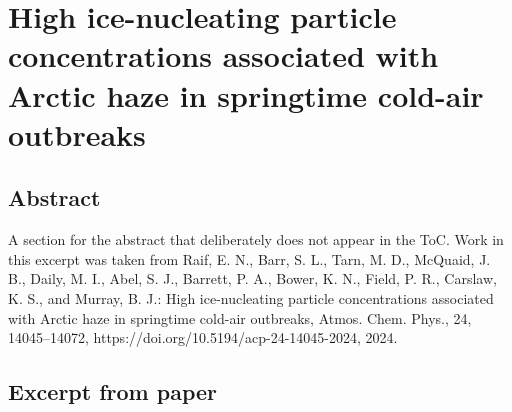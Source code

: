 \chapter[High ice-nucleating particle concentrations associated with Arctic haze in springtime cold-air outbreaks]{High ice-nucleating particle concentrations associated with Arctic haze in springtime cold-air outbreaks}
\label{ch:measurements}
\section*{Abstract}
A section for the abstract that deliberately does not appear in the ToC.
Work in this excerpt was taken from Raif, E. N., Barr, S. L., Tarn, M. D., McQuaid, J. B., Daily, M. I., Abel, S. J., Barrett, P. A., Bower, K. N., Field, P. R., Carslaw, K. S., and Murray, B. J.: High ice-nucleating particle concentrations associated with Arctic haze in springtime cold-air outbreaks, Atmos. Chem. Phys., 24, 14045–14072, https://doi.org/10.5194/acp-24-14045-2024, 2024.

\section{Excerpt from paper}

